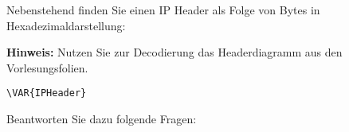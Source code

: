 \question{}

\begin{minipage}{.45\linewidth}
Nebenstehend finden Sie einen IP Header
als Folge von Bytes in Hexadezimaldarstellung:

\textbf{Hinweis:} Nutzen Sie zur Decodierung das Headerdiagramm aus den Vorlesungsfolien.
\end{minipage}
\hfill
\begin{minipage}{.45\linewidth}
\begin{verbatim}
\VAR{IPHeader}
\end{verbatim}
\end{minipage}

Beantworten Sie dazu folgende Fragen:
\setlength\answerskip{\dimexpr-\baselineskip}
